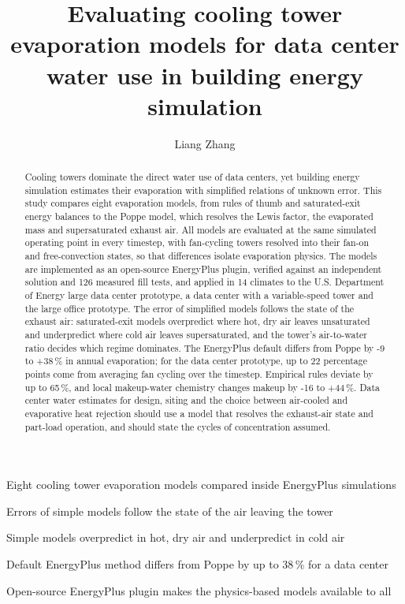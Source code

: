 \documentclass[preprint,12pt]{elsarticle}
\begin{document}
\begin{frontmatter}
\title{Evaluating cooling tower evaporation models for data center water use in building energy simulation}

\author[a,b]{Liang Zhang}

\begin{abstract}
Cooling towers dominate the direct water use of data centers, yet building energy simulation estimates their
evaporation with simplified relations of unknown error. This study compares eight evaporation models, from
rules of thumb and saturated-exit energy balances to the Poppe model, which resolves the Lewis factor, the evaporated
mass and supersaturated exhaust air. All models are evaluated at the same simulated operating point in every timestep,
with fan-cycling towers resolved into their fan-on and free-convection states, so that differences isolate evaporation physics. The models are implemented as an open-source EnergyPlus plugin, verified against an
independent solution and 126 measured fill tests, and applied in 14 climates to the U.S. Department of Energy large data
center prototype, a data center with a variable-speed tower and the large office prototype. The error
of simplified models follows the state of the exhaust air: saturated-exit models overpredict where hot, dry air leaves
unsaturated and underpredict where cold air leaves supersaturated, and the tower's air-to-water ratio decides which
regime dominates. The EnergyPlus default differs from Poppe by -9 to +38\,\% in annual evaporation; for the
data center prototype, up to 22 percentage points come from averaging fan cycling over the timestep. Empirical rules
deviate by up to 65\,\%, and local makeup-water chemistry changes makeup by -16 to +44\,\%. Data center water estimates
for design, siting and the choice between air-cooled and evaporative heat rejection should use a model that resolves
the exhaust-air state and part-load operation, and should state the cycles of concentration assumed.
\end{abstract}

\begin{highlights}
\item Eight cooling tower evaporation models compared inside EnergyPlus simulations
\item Errors of simple models follow the state of the air leaving the tower
\item Simple models overpredict in hot, dry air and underpredict in cold air
\item Default EnergyPlus method differs from Poppe by up to 38\,\% for a data center
\item Open-source EnergyPlus plugin makes the physics-based models available to all
\end{highlights}


\end{frontmatter}
\end{document}
